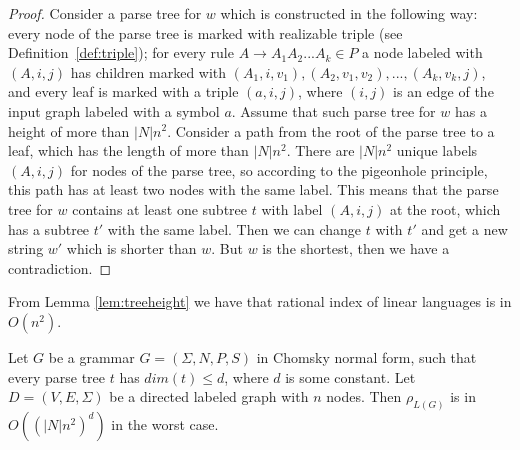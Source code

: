\begin{proof}
Consider a parse tree for $w$ which is constructed in the following way: every node of the parse tree is marked with realizable triple (see Definition~\ref{def:triple}); for every rule $A \rightarrow A_1A_2...A_k \in P$ a node labeled with $(A, i, j)$ has children marked with $(A_1, i, v_1), (A_2, v_1, v_2), ..., (A_k, v_k, j)$, and every leaf is marked with a triple $(a, i, j)$, where $(i, j)$ is an edge of the input graph labeled with a symbol $a$. Assume that such parse tree for $w$ has a height of more than $|N|n^2$. Consider a path from the root of the parse tree to a leaf, which has the length of more than $|N|n^2$. There are $|N|n^2$ unique labels $(A, i, j)$ for nodes of the parse tree, so according to the pigeonhole principle, this path has at least two nodes with the same label. This means that the parse tree for $w$ contains at least one subtree $t$ with label $(A, i, j)$ at the root, which has a subtree $t'$ with the same label. Then we can change $t$ with $t'$ and get a new string $w'$ which is shorter than $w$. But $w$ is the shortest, then we have a contradiction.

\end{proof}
From Lemma \ref{lem:treeheight} we have that rational index of linear languages is in $O(n^2)$. 
\begin{lemma}
\label{oscbnddim}
Let $G$ be a grammar $G = (\Sigma, N, P, S)$ in Chomsky normal form, such that every parse tree $t$ has $dim(t) \le d$, where $d$ is some constant. Let $D=(V, E, \Sigma)$ be a directed labeled graph with $n$ nodes. Then $\rho_{L(G)}$ is in $O({(|N|n^2)}^d)$ in the worst case.
\end{lemma}
